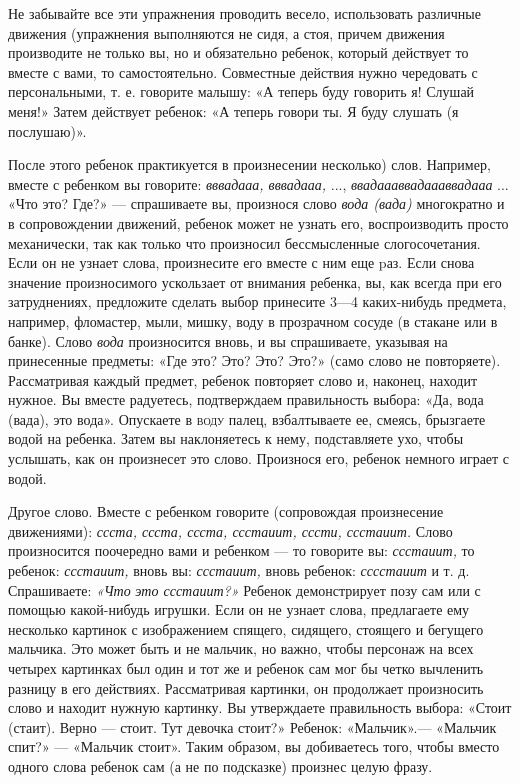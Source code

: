\documentclass[a5paper]{book}
\renewcommand{\emph}[1]{\textit{#1}}
\begin{document}
Не забывайте все эти упражнения проводить весело, использовать различные
движения (упражнения выполняются не сидя, а стоя, причем движения
производите не только вы, но и обязательно ребенок, который действует то
вместе с вами, то самостоятельно. Совместные действия нужно чередовать с
персональными, т. е. говорите малышу: «А теперь буду говорить я! Слушай
меня!» Затем действует ребенок: «А теперь говори ты. Я буду слушать (я
послушаю)».

После этого ребенок практикуется в произнесении несколько) слов.
Например, вместе с ребенком вы говорите: \emph{вввадааа, вввадааа,} ...,
\emph{ввадаааввадаааввадааа} ... «Что это? Где?» --- спрашиваете вы,
произнося слово \emph{вода (вада)} многократно и в сопровождении
движений, ребенок может не узнать его, воспроизводить просто
механически, так как только что произносил бессмысленные слогосочетания.
Если он не узнает слова, произнесите его вместе с ним еще pаз. Если
снова значение произносимого ускользает от внимания ребенка, вы, как
всегда при его затруднениях, предложите сделать выбор принесите 3---4
каких-нибудь предмета, например, фломастер, мыли, мишку, воду в
прозрачном сосуде (в стакане или в банке). Слово \emph{вода}
произносится вновь, и вы спрашиваете, указывая на принесенные предметы:
«Где это? Это? Это? Это?» (само слово не повторяете). Рассматривая
каждый предмет, ребенок повторяет слово и, наконец, находит нужное. Вы
вместе радуетесь, подтверждаем правильность выбора: «Да, вода (вада),
это вода». Опускаете в \textsc{воду} палец, взбалтываете ее, смеясь,
брызгаете водой на ребенка. Затем вы наклоняетесь к нему, подставляете
ухо, чтобы услышать, как он произнесет это слово. Произнося его, ребенок
немного играет с водой.

Другое слово. Вместе с ребенком говорите (сопровождая произнесение
движениями): \emph{ссста, ссста, ссста, ссстаиит, сссти, ссстаиит.}
Слово произносится поочередно вами и ребенком --- то говорите вы:
\emph{ссстаиит,} то ребенок: \emph{ссстаиит,} вновь вы: \emph{ссстаиит,}
вновь ребенок: \emph{сссстаиит} и т. д. Спрашиваете: \emph{«Что}
\emph{это ссстаиит?»} Ребенок демонстрирует позу сам или с помощью
какой-нибудь игрушки. Если он не узнает слова, предлагаете ему несколько
картинок с изображением спящего, сидящего, стоящего и бегущего мальчика.
Это может быть и не мальчик, но важно, чтобы персонаж на всех четырех
картинках был один и тот же и ребенок сам мог бы четко вычленить разницу
в его действиях. Рассматривая картинки, он продолжает произносить слово
и находит нужную картинку. Вы утверждаете правильность выбора: «Стоит
(стаит). Верно --- стоит. Тут девочка стоит?» Ребенок: «Мальчик».---
«Мальчик спит?» --- «Мальчик стоит». Таким образом, вы добиваетесь того,
чтобы вместо одного слова ребенок сам (а не по подсказке) произнес целую
фразу.
\end{document}
